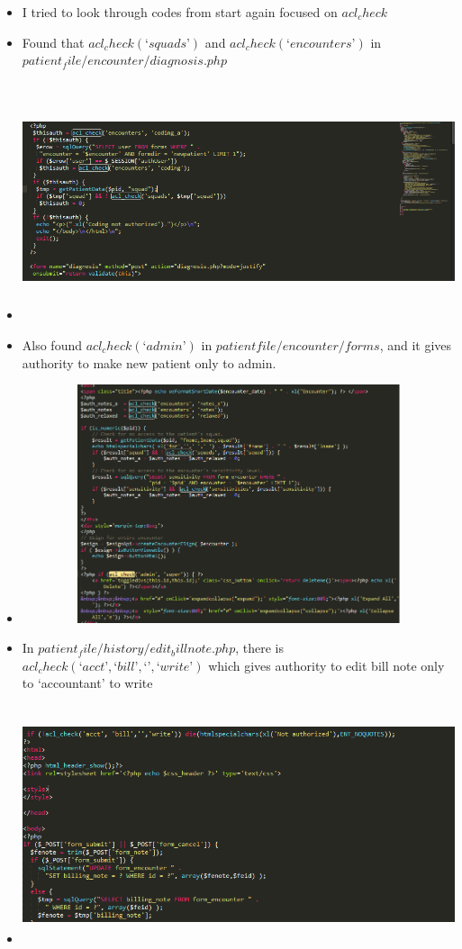 \documentclass[paper=a4, fontsize=11pt]{scrartcl} %
\numberwithin{equation}{section} %
\numberwithin{figure}{section} %
\numberwithin{table}{section} %
\begin{document}
\begin{itemize}
		\item I tried to look through codes from start again focused on $acl_check$
		\item Found that $acl_check(‘squads’)$ and $acl_check(‘encounters’)$ in $patient_file/encounter/diagnosis.php$ 
		\item
		\includegraphics[width = 20cm, height=7cm]{pictures/3rdaclcheck.png}
		\item Also found $acl_check(‘admin’)$ in $patientfile/encounter/forms$, and it gives authority to make new patient only to admin.
		\item
		\includegraphics[width = 20cm, height=7cm]{pictures/4thaclcheck.png}
		\item In $patient_file/history/edit_billnote.php$, there is $acl_check(‘acct’, ‘bill’, ‘’, ‘write’)$ which gives authority to edit bill note only to ‘accountant’ to write
		\item
		\includegraphics[width = 20cm, height=7cm]{pictures/5thaclcheck.png}

\end{itemize}
\end{document}
